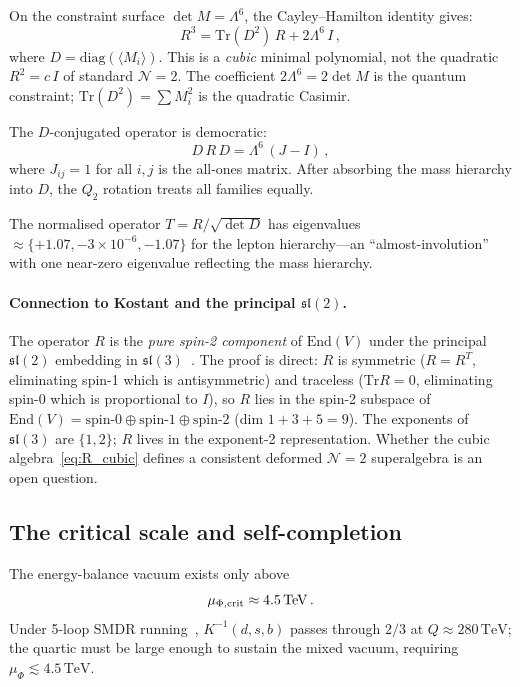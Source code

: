 \documentclass[12pt,a4paper]{article}
\newcommand{\Tr}{\mathrm{Tr}}
\newcommand{\diag}{\mathrm{diag}}
\newcommand{\TeV}{\,\mathrm{TeV}}
\begin{document}
On the constraint surface $\det M = \Lambda^6$, the
Cayley--Hamilton identity gives:
\begin{equation}
  R^3 = \Tr(D^2)\,R + 2\Lambda^6\,I\,,
  \label{eq:R_cubic}
\end{equation}
where $D = \diag(\langle M_i\rangle)$.
This is a \emph{cubic} minimal polynomial, not the quadratic
$R^2 = c\,I$ of standard $\mathcal{N}{=}2$.
The coefficient $2\Lambda^6 = 2\det M$ is the quantum
constraint; $\Tr(D^2) = \sum M_i^2$ is the quadratic Casimir.

The $D$-conjugated operator is democratic:
\begin{equation}
  D\, R\, D = \Lambda^6\,(J - I)\,,
  \label{eq:DRD}
\end{equation}
where $J_{ij} = 1$ for all $i,j$ is the all-ones matrix.
After absorbing the mass hierarchy into $D$, the $Q_2$
rotation treats all families equally.

The normalised operator $T = R/\sqrt{\det D}$ has eigenvalues
$\approx \{+1.07, -3 \times 10^{-6}, -1.07\}$ for the
lepton hierarchy---an ``almost-involution'' with one near-zero
eigenvalue reflecting the mass hierarchy.

\paragraph{Connection to Kostant and the principal $\mathfrak{sl}(2)$.}
The operator $R$ is the \emph{pure spin-2 component} of
$\mathrm{End}(V)$ under the principal $\mathfrak{sl}(2)$
embedding in $\mathfrak{sl}(3)$~\cite{Kostant:1959}.
The proof is direct: $R$ is symmetric ($R = R^T$, eliminating
spin-1 which is antisymmetric) and traceless ($\Tr R = 0$,
eliminating spin-0 which is proportional to $I$), so $R$
lies in the spin-2 subspace of
$\mathrm{End}(V) = \text{spin-0} \oplus \text{spin-1}
\oplus \text{spin-2}$ (dim $1 + 3 + 5 = 9$).
The exponents of $\mathfrak{sl}(3)$ are $\{1, 2\}$; $R$ lives
in the exponent-2 representation.
Whether the cubic algebra~\eqref{eq:R_cubic} defines a
consistent deformed $\mathcal{N}{=}2$ superalgebra is an open
question.


\subsection{The critical scale and self-completion}

The energy-balance vacuum exists only above
\begin{equation}
  \mu_{\Phi,\rm crit} \approx 4.5\TeV\,.
  \label{eq:mucrit}
\end{equation}
Under 5-loop SMDR running~\cite{MartinRobertson:2019,PDG:2024},
$K^{-1}(d,s,b)$ passes through $2/3$ at $Q \approx 280\TeV$;
the quartic must be large enough to sustain the mixed vacuum,
requiring $\mu_\Phi \lesssim 4.5\TeV$.
\end{document}
